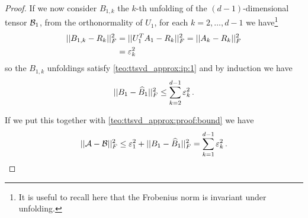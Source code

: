 \begin{Teo}
\begin{proof}
    If we now consider $B_{1,k}$ the $k$-th unfolding of the $(d-1)$-dimensional tensor $\mathcal{B}_1$, from the orthonormality of $U_1$, for each $k=2,\ldots,d-1$ we have\footnote{It is useful to recall here that the Frobenius norm is invariant under unfolding.}
    \begin{equation*}
      \begin{split}
        ||B_{1,k} - R_k||_F^2 &= ||U_1^T A_1 - R_k||_F^2 = ||A_k - R_k||_F^2\\
         &= \varepsilon_k^2
      \end{split}
    \end{equation*}
    so the $B_{1,k}$ unfoldings satisfy \eqref{teo:ttsvd_approx:ip:1} and by induction we have
    \begin{equation*}
      ||B_1 - \widehat{B}_1 ||_F^2 \le \sum_{k=2}^{d-1} \varepsilon_k^2\, .
    \end{equation*}

    If we put this together with \eqref{teo:ttsvd_approx:proof:bound} we have
    \begin{equation*}
      ||\mathcal{A} - \mathcal{B}||_F^2 \le \varepsilon_1^2 + ||B_1 - \widehat{B}_1 ||_F^2 = \sum_{k=1}^{d-1} \varepsilon_k^2\, .
    \end{equation*}
  \end{proof}
\end{Teo}

